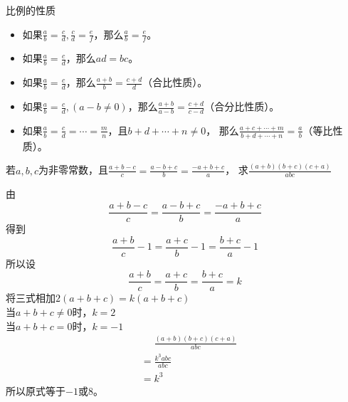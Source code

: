 \documentclass[windows,csize4,answers]{BHCexam}
\begin{document}
\begin{groups}
    比例的性质
    \begin{itemize}
        \item 如果$\frac{a}{b}=\frac{c}{d}, \frac{c}{d}=\frac{e}{f}$，那么$\frac{a}{b}=\frac{e}{f}$。
        \item 如果$\frac{a}{b}=\frac{c}{d}$，那么$ad=bc$。
        \item 如果$\frac{a}{b}=\frac{c}{d}$，那么$\frac{a+b}{b}=\frac{c+d}{d}$（合比性质）。
        \item 如果$\frac{a}{b}=\frac{c}{d},(a-b\neq 0)$，那么$\frac{a+b}{a-b}=\frac{c+d}{c-d}$（合分比性质）。
        \item 如果$\frac{a}{b}=\frac{c}{d}=\cdots =\frac{m}{n}$，且$b+d+\cdots +n\neq 0$，
              那么$\frac{a+c+\cdots +m}{b+d+\cdots +n}=\frac{a}{b}$（等比性质）。
    \end{itemize}



    \begin{questions}[]

        \question[5] 若$a,b,c$为非零常数，且$\frac{a+b-c}{c}=\frac{a-b+c}{b}=\frac{-a+b+c}{a}$，
        求$\frac{(a+b)(b+c)(c+a)}{abc}$
        \begin{solution}{0.5cm}
            \methodonly 由
            \[
                \frac{a+b-c}{c}=\frac{a-b+c}{b}=\frac{-a+b+c}{a}
            \]
            得到
            \[
                \frac{a+b}{c}-1=\frac{a+c}{b}-1=\frac{b+c}{a}-1
            \]
            所以设
            \[
                \frac{a+b}{c}=\frac{a+c}{b}=\frac{b+c}{a}=k
            \]
            将三式相加$2(a+b+c)=k(a+b+c)$ \\
            当$a+b+c\neq 0$时，$k=2$\\
            当$a+b+c=0$时，$k=-1$\\
            \[
                \begin{aligned}
                     & \phantom{=} \frac{(a+b)(b+c)(c+a)}{abc} \\
                     & = \frac{k^3 abc}{abc}                   \\
                     & = k^3
                \end{aligned}
            \]
            所以原式等于$-1$或$8$。
        \end{solution}
        \vspace{3.5cm}


\end{questions}
\end{groups}
\end{document}
